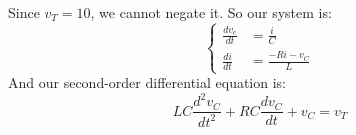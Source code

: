 \documentclass[preview]{standalone}
\begin{document}
\begin{center}
Since $v_T = 10$, we cannot negate it. So our system is:
                    \[
                    \left\{
                        \begin{aligned}
                            \frac{dv_c}{dt} &= \frac{i}{C} \\
                            \frac{di}{dt} &= \frac{-Ri - v_C}{L}
                        \end{aligned}
                    \right.
                    \]
                    And our second-order differential equation is:
                    \[
                    LC\frac{d^2v_C}{dt^2} + RC\frac{dv_C}{dt} + v_C = v_T
                    \]
\end{center}
\end{document}
